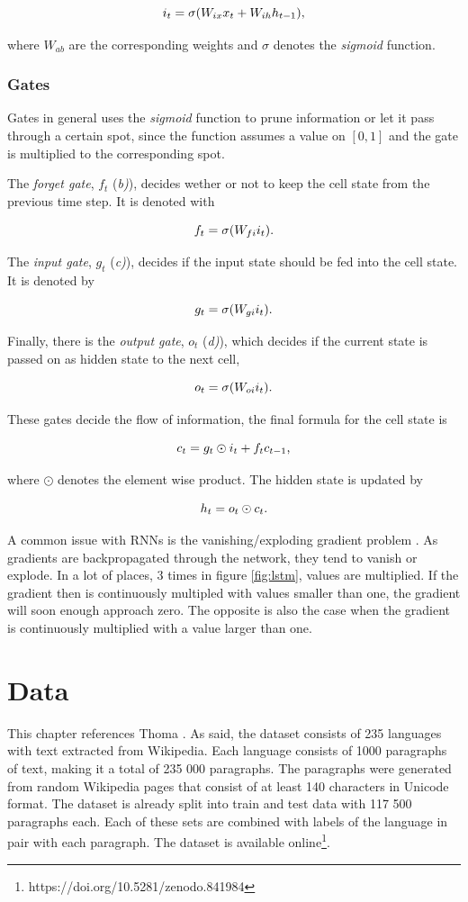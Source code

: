 \documentclass[conference]{IEEEtran}
\begin{document}
$$i_t=\sigma(W_{ix}x_t+W_{ih}h_{t-1})\textnormal{,}$$

where $W_{ab}$ are the corresponding weights and $\sigma$ denotes the \textit{sigmoid} function.

\subsubsection{Gates}
Gates in general uses the \textit{sigmoid} function to prune information or let it pass through a certain spot, since the function assumes a value on $[0,1]$ and the gate is multiplied to the corresponding spot. 

The \textit{forget gate}, $f_t$ (\textit{b)}), decides wether or not to keep the cell state from the previous time step. It is denoted with

$$f_t=\sigma(W_{fi}i_t)\textnormal{.}$$

The \textit{input gate}, $g_t$ (\textit{c)}), decides if the input state should be fed into the cell state. It is denoted by

$$g_t=\sigma(W_{gi}i_t)\textnormal{.}$$

Finally, there is the \textit{output gate}, $o_t$ (\textit{d)}), which decides if the current state is passed on as hidden state to the next cell,

$$o_t=\sigma(W_{oi}i_t)\textnormal{.}$$

These gates decide the flow of information, the final formula for the cell state is

$$c_t = g_t \odot i_t + f_t c_{t-1}\textnormal{,}$$

where $\odot$ denotes the element wise product. The hidden state is updated by

$$h_t = o_t \odot c_t\textnormal{.}$$

A common issue with RNNs is the vanishing/exploding gradient problem \cite{dl-book}. As gradients are backpropagated through the network, they tend to vanish or explode. In a lot of places, 3 times in figure \ref{fig:lstm}, values are multiplied. If the gradient then is continuously multipled with values smaller than one, the gradient will soon enough approach zero. The opposite is also the case when the gradient is continuously multiplied with a value larger than one.

\section{Data}
This chapter references Thoma \cite{wili}. As said, the dataset consists of 235 languages with text extracted from Wikipedia. Each language consists of 1000 paragraphs of text, making it a total of 235 000 paragraphs. The paragraphs were generated from random Wikipedia pages that consist of at least 140 characters in Unicode format. The dataset is already split into train and test data with 117 500 paragraphs each. Each of these sets are combined with labels of the language in pair with each paragraph.  The dataset is available online\footnote{https://doi.org/10.5281/zenodo.841984}.
\end{document}
